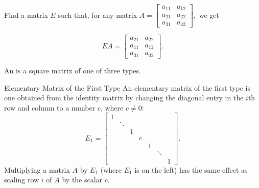 Find a matrix $E$ such that, for any matrix
$A =   \left[ \begin{array}{cc} a_{11} & a_{12}  \\
a_{21} & a_{22}  \\ 
a_{31} & a_{32}  
 \end{array} \right],$ we get

\[EA = \left[ \begin{array}{cc} a_{21} & a_{22}  \\
a_{11} & a_{12}  \\ 
a_{31} & a_{32}  
 \end{array} \right].\]






\endedxproblem

\endedxvertical





{}  An {} is a square matrix of one of three types.  


\begin{edXshowhide}{Elementary Matrix of the First Type}
An elementary matrix of the first type is one obtained from the identity matrix by changing the diagonal entry in the 
$i$th row and column to a number 
$c$, where $c \ne 0$:  
\[ E_1 = \left[ 
\begin{array}{ccccccc}
1 &  &  &  &  &  &  \\
 & \ddots &  &  &  &  &  \\
 &   & 1& &  &  &  \\
 &   &  &  c &  &  &  \\
 &   &  &  & 1 &  &  \\
 &   &  &  &  & \ddots  &  \\
 &   &  &  &  &   & 1 
\end{array}
\right].  \]
Multiplying  a matrix $A$ by $E_1$ (where $E_1$ is on the left) has the same effect as scaling row $i$ of $A$ by the scalar $c$.  
\end{edXshowhide}

